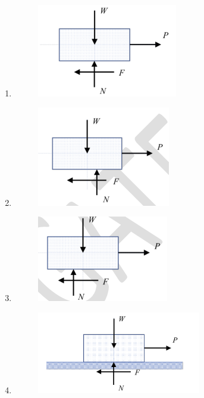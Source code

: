 \documentclass[12pt]{article}
\begin{document}
\begin{enumerate}
\begin{enumerate}
\item \begin{figure}[H]
    \centering
    \includegraphics[width=0.5\columnwidth]{figs/ass5_d_q68_a.png}
    \caption{}
    \label{fig:placeholder}
\end{figure}
\item \begin{figure}[H]
    \centering
    \includegraphics[width=0.5\columnwidth]{figs/ass5_d_q68_b.png}
    \caption{}
    \label{fig:placeholder}
\end{figure}
\item \begin{figure}[H]
    \centering
    \includegraphics[width=0.5\columnwidth]{figs/ass5_d_q68_c.png}
    \caption{}
    \label{fig:placeholder}
\end{figure}
\item \begin{figure}[H]
    \centering
    \includegraphics[width=0.5\columnwidth]{figs/ass5_d_q68_d.png}
    \caption{}
    \label{fig:placeholder}
\end{figure}
\end{enumerate}


\end{enumerate}
\end{document}

